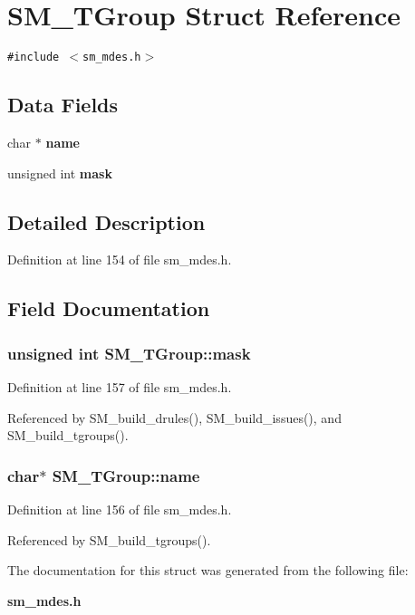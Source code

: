 \section{SM\_\-TGroup Struct Reference}
\label{structSM__TGroup}
{\tt \#include $<$sm\_\-mdes.h$>$}

\subsection*{Data Fields}
\begin{CompactItemize}
\item 
char $\ast$ \bf{name}
\item 
unsigned int \bf{mask}
\end{CompactItemize}


\subsection{Detailed Description}




Definition at line 154 of file sm\_\-mdes.h.

\subsection{Field Documentation}
\subsubsection{\setlength{\rightskip}{0pt plus 5cm}unsigned int \bf{SM\_\-TGroup::mask}}\label{structSM__TGroup_fd6ebc9a4762418b200083ae815536cf}




Definition at line 157 of file sm\_\-mdes.h.

Referenced by SM\_\-build\_\-drules(), SM\_\-build\_\-issues(), and SM\_\-build\_\-tgroups().
\subsubsection{\setlength{\rightskip}{0pt plus 5cm}char$\ast$ \bf{SM\_\-TGroup::name}}\label{structSM__TGroup_0396610df070d7d86d852542b6854ff8}




Definition at line 156 of file sm\_\-mdes.h.

Referenced by SM\_\-build\_\-tgroups().

The documentation for this struct was generated from the following file:\begin{CompactItemize}
\item 
\bf{sm\_\-mdes.h}\end{CompactItemize}
